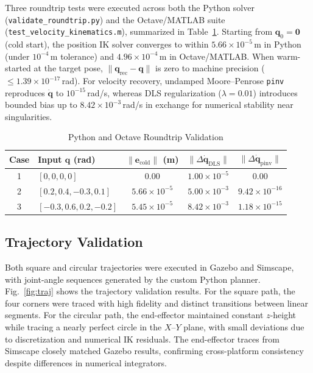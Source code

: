 \documentclass[conference]{IEEEtran}
\begin{document}
Three roundtrip tests were executed across both the Python solver (\texttt{validate\_roundtrip.py}) and the Octave/MATLAB suite (\texttt{test\_velocity\_kinematics.m}), summarized in Table~\ref{tab:ik}. Starting from $\mathbf{q}_0 = \mathbf{0}$ (cold start), the position IK solver converges to within $5.66\times 10^{-5}$\,m in Python (under $10^{-4}$\,m tolerance) and $4.96\times 10^{-4}$\,m in Octave/MATLAB. When warm-started at the target pose, $\|\mathbf{q}_{\text{rec}} - \mathbf{q}\|$ is zero to machine precision ($\le 1.39\times 10^{-17}$\,rad). For velocity recovery, undamped Moore--Penrose \texttt{pinv} reproduces $\dot{\mathbf{q}}$ to $10^{-15}$\,rad/s, whereas DLS regularization ($\lambda=0.01$) introduces bounded bias up to $8.42\times 10^{-3}$\,rad/s in exchange for numerical stability near singularities.

\begin{table}[H]
\centering
\caption{Python and Octave Roundtrip Validation}
\label{tab:ik}
\setlength{\tabcolsep}{2.5pt}
\footnotesize
\begin{tabular}{clccc}
\toprule
\textbf{Case} & \textbf{Input $\mathbf{q}$ (rad)} & $\|\mathbf{e}_{\text{cold}}\|$ (m) & $\|\Delta\dot{\mathbf{q}}_{\text{DLS}}\|$ & $\|\Delta\dot{\mathbf{q}}_{\text{pinv}}\|$ \\
\midrule
1 & $[0,0,0,0]$ & $0.00$ & $1.00{\times}10^{-5}$ & $0.00$ \\
2 & $[0.2,0.4,{-}0.3,0.1]$ & $5.66{\times}10^{-5}$ & $5.00{\times}10^{-3}$ & $9.42{\times}10^{-16}$ \\
3 & $[{-}0.3,0.6,0.2,{-}0.2]$ & $5.45{\times}10^{-5}$ & $8.42{\times}10^{-3}$ & $1.18{\times}10^{-15}$ \\
\bottomrule
\end{tabular}
\end{table}

\subsection{Trajectory Validation}

Both square and circular trajectories were executed in Gazebo and Simscape, with joint-angle sequences generated by the custom Python planner. Fig.~\ref{fig:traj} shows the trajectory validation results. For the square path, the four corners were traced with high fidelity and distinct transitions between linear segments. For the circular path, the end-effector maintained constant $z$-height while tracing a nearly perfect circle in the $X$--$Y$ plane, with small deviations due to discretization and numerical IK residuals. The end-effector traces from Simscape closely matched Gazebo results, confirming cross-platform consistency despite differences in numerical integrators.
\end{document}
